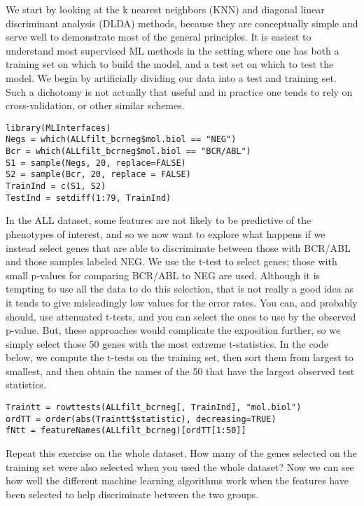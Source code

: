 We start by looking at the k nearest neighbors (KNN) and diagonal linear
discriminant analysis (DLDA) methods, because they are conceptually
simple and serve well to demonstrate most of the general principles. It
is easiest to understand most supervised ML methods in the setting where
one has both a training set on which to build the model, and a test set
on which to test the model. We begin by artificially dividing our data
into a test and training set. Such a dichotomy is not actually that
useful and in practice one tends to rely on cross-validation, or other
similar schemes.

\begin{verbatim}
library(MLInterfaces)
Negs = which(ALLfilt_bcrneg$mol.biol == "NEG")
Bcr = which(ALLfilt_bcrneg$mol.biol == "BCR/ABL")
S1 = sample(Negs, 20, replace=FALSE)
S2 = sample(Bcr, 20, replace = FALSE)
TrainInd = c(S1, S2)
TestInd = setdiff(1:79, TrainInd)
\end{verbatim}

In the ALL dataset, some features are not likely to be predictive of the
phenotypes of interest, and so we now want to explore what happens if we
instead select genes that are able to discriminate between those with
BCR/ABL and those samples labeled NEG. We use the t-test to select
genes; those with small p-values for comparing BCR/ABL to NEG are used.
Although it is tempting to use all the data to do this selection, that
is not really a good idea as it tends to give misleadingly low values
for the error rates. You can, and probably should, use attenuated
t-tests, and you can select the ones to use by the observed p-value.
But, these approaches would complicate the exposition further, so we
simply select those 50 genes with the most extreme t-statistics. In the
code below, we compute the t-tests on the training set, then sort them
from largest to smallest, and then obtain the names of the 50 that have
the largest observed test statistics.

\begin{verbatim}
Traintt = rowttests(ALLfilt_bcrneg[, TrainInd], "mol.biol")
ordTT = order(abs(Traintt$statistic), decreasing=TRUE)
fNtt = featureNames(ALLfilt_bcrneg)[ordTT[1:50]]
\end{verbatim}

Repeat this exercise on the whole dataset. How many of the genes
selected on the training set were also selected when you used the whole
dataset? Now we can see how well the different machine learning
algorithms work when the features have been selected to help
discriminate between the two groups.

